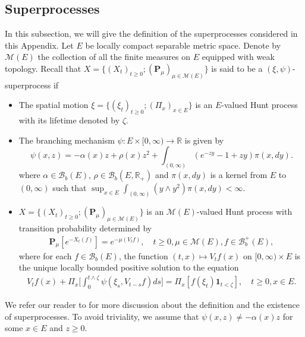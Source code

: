 \documentclass[12pt,a4paper]{amsart}
\theoremstyle{plain}
\theoremstyle{definition}
\numberwithin{equation}{section}
\begin{document}
\subsection{Superprocesses}
\label{sec: definition of superprocess}
    In this subsection, we will give the definition of the superprocesses considered in this Appendix.
Let $E$ be locally compact separable metric space. Denote by $\mathcal M(E)$ the collection of all the finite measures on $E$ equipped with weak topology.
    Recall that $X=\{(X_t)_{t\geq 0}; (\mathbf P_\mu)_{\mu \in \mathcal M(E)}\}$ is said to be a $(\xi,\psi)$-superprocess if
\begin{itemize}
\item
    The spatial motion $\xi=\{(\xi_t)_{t\geq 0};(\Pi_x)_{x\in E}\}$ is an $E$-valued Hunt process with its lifetime denoted by $\zeta$.
\item
    The branching mechanism $\psi: E\times[0,\infty) \to \mathbb R$ is given by
\begin{equation}
\label{eq: branching mechanism}
    \psi(x,z)=
    - \alpha(x) z + \rho (x) z^2 + \int_{(0,\infty)} (e^{-zy} - 1 + zy) \pi(x,dy).
\end{equation}
    where $\alpha \in \mathcal B_b(E)$, $\rho \in \mathcal B_b(E, \mathbb R_+)$ and $\pi(x,dy)$ is a kernel from $E$ to $(0,\infty)$ such that $\sup_{x\in E} \int_{(0,\infty)} (y\wedge y^2) \pi(x,dy) < \infty$.
\item
    $X=\{(X_t)_{t\geq 0}; (\mathbf P_\mu)_{\mu \in \mathcal M(E)}\}$ is an $\mathcal M(E)$-valued Hunt process with transition probability determined by
\begin{equation}\begin{split}
    \mathbf P_\mu [e^{-X_t(f)}] = e^{-\mu(V_tf)},
    \quad t\geq 0, \mu \in \mathcal M(E), f\in \mathcal B^+_b(E),
\end{split}\end{equation}
    where for each $f\in \mathcal B_b(E)$, the function $(t,x)\mapsto V_tf(x)$ on $[0,\infty) \times E$ is the unique locally bounded positive solution to the equation
\begin{equation}\begin{split}\label{eq:FKPP_in_definition}
    V_tf(x) + \Pi_x \Big[  \int_0^{t\wedge \zeta} \psi(\xi_s,V_{t-s}f)ds \Big]
    = \Pi_x [ f(\xi_t)\mathbf 1_{t<\zeta} ],
    \quad t \geq 0, x \in E.
\end{split}\end{equation}
\end{itemize}
    We refer our reader to \cite{Li2011Measure-valued} for more discussion about the definition and the existence of superprocesses.
    To avoid triviality, we assume that $\psi(x,z)\neq -\alpha(x)z$ for some $x \in E$ and $z \geq 0$.
\end{document}
